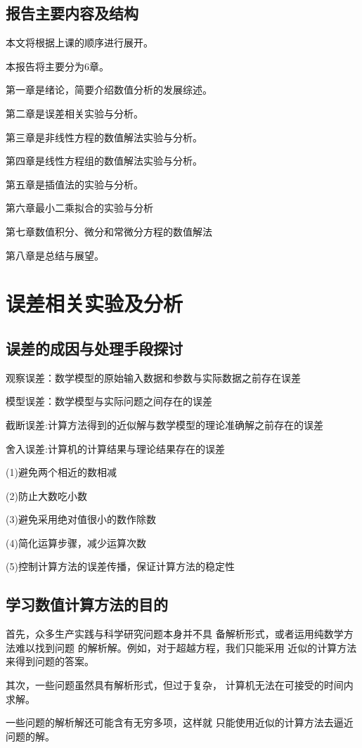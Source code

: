 \documentclass[UTF8]{ctexart}
\begin{document}
\subsection{报告主要内容及结构}
本文将根据上课的顺序进行展开。

本报告将主要分为6章。

第一章是绪论，简要介绍数值分析的发展综述。

第二章是误差相关实验与分析。

第三章是非线性方程的数值解法实验与分析。

第四章是线性方程组的数值解法实验与分析。

第五章是插值法的实验与分析。

第六章最小二乘拟合的实验与分析

第七章数值积分、微分和常微分方程的数值解法

第八章是总结与展望。

\newpage


\section{误差相关实验及分析}
\subsection{误差的成因与处理手段探讨}
观察误差：数学模型的原始输入数据和参数与实际数据之前存在误差

模型误差：数学模型与实际问题之间存在的误差

截断误差:计算方法得到的近似解与数学模型的理论准确解之前存在的误差

舍入误差:计算机的计算结果与理论结果存在的误差

(1)避免两个相近的数相减

(2)防止大数吃小数

(3)避免采用绝对值很小的数作除数

(4)简化运算步骤，减少运算次数

(5)控制计算方法的误差传播，保证计算方法的稳定性
\subsection{学习数值计算方法的目的}
首先，众多生产实践与科学研究问题本身并不具
备解析形式，或者运用纯数学方法难以找到问题
的解析解。例如，对于超越方程，我们只能采用
近似的计算方法来得到问题的答案。

其次，一些问题虽然具有解析形式，但过于复杂，
计算机无法在可接受的时间内求解。

一些问题的解析解还可能含有无穷多项，这样就
只能使用近似的计算方法去逼近问题的解。
\end{document}
